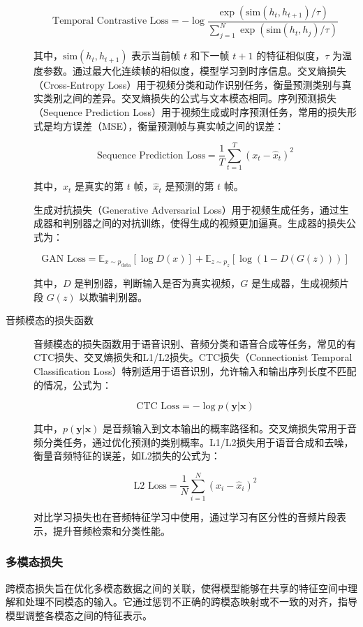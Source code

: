 \documentclass[12pt]{article}
\begin{document}
\begin{description}
    \[
    \text{Temporal Contrastive Loss} = -\log \frac{\exp(\text{sim}(h_t, h_{t+1}) / \tau)}{\sum_{j=1}^{N} \exp(\text{sim}(h_t, h_j) / \tau)}
    \]
 
    其中，\( \text{sim}(h_t, h_{t+1}) \) 表示当前帧 \( t \) 和下一帧 \( t+1 \) 的特征相似度，\( \tau \) 为温度参数。通过最大化连续帧的相似度，模型学习到时序信息。交叉熵损失（Cross-Entropy Loss）用于视频分类和动作识别任务，衡量预测类别与真实类别之间的差异。交叉熵损失的公式与文本模态相同。序列预测损失（Sequence Prediction Loss）用于视频生成或时序预测任务，常用的损失形式是均方误差（MSE），衡量预测帧与真实帧之间的误差：

    \[
    \text{Sequence Prediction Loss} = \frac{1}{T} \sum_{t=1}^{T} (x_t - \hat{x}_t)^2
    \]
 
    其中，\( x_t \) 是真实的第 \( t \) 帧，\( \hat{x}_t \) 是预测的第 \( t \) 帧。
    
    生成对抗损失（Generative Adversarial Loss）用于视频生成任务，通过生成器和判别器之间的对抗训练，使得生成的视频更加逼真。生成器的损失公式为：

    \[
    \text{GAN Loss} = \mathbb{E}_{x \sim p_{\text{data}}}[\log D(x)] + \mathbb{E}_{z \sim p_z}[\log (1 - D(G(z)))]
    \]
 
    其中，\( D \) 是判别器，判断输入是否为真实视频，\( G \) 是生成器，生成视频片段 \( G(z) \) 以欺骗判别器。
 \item[音频模态的损失函数]
 音频模态的损失函数用于语音识别、音频分类和语音合成等任务，常见的有CTC损失、交叉熵损失和L1/L2损失。CTC损失（Connectionist Temporal Classification Loss）特别适用于语音识别，允许输入和输出序列长度不匹配的情况，公式为：
 
 \[
 \text{CTC Loss} = -\log p(\mathbf{y} | \mathbf{x})
 \]
 
 其中，\( p(\mathbf{y} | \mathbf{x}) \) 是音频输入到文本输出的概率路径和。交叉熵损失常用于音频分类任务，通过优化预测的类别概率。L1/L2损失用于语音合成和去噪，衡量音频特征的误差，如L2损失的公式为：
 
 \[
 \text{L2 Loss} = \frac{1}{N} \sum_{i=1}^{N} (x_i - \hat{x}_i)^2
 \]
 
 对比学习损失也在音频特征学习中使用，通过学习有区分性的音频片段表示，提升音频检索和分类性能。
 

\end{description}
\subsubsection{多模态损失}

跨模态损失旨在优化多模态数据之间的关联，使得模型能够在共享的特征空间中理解和处理不同模态的输入。它通过惩罚不正确的跨模态映射或不一致的对齐，指导模型调整各模态之间的特征表示。
\end{document}
